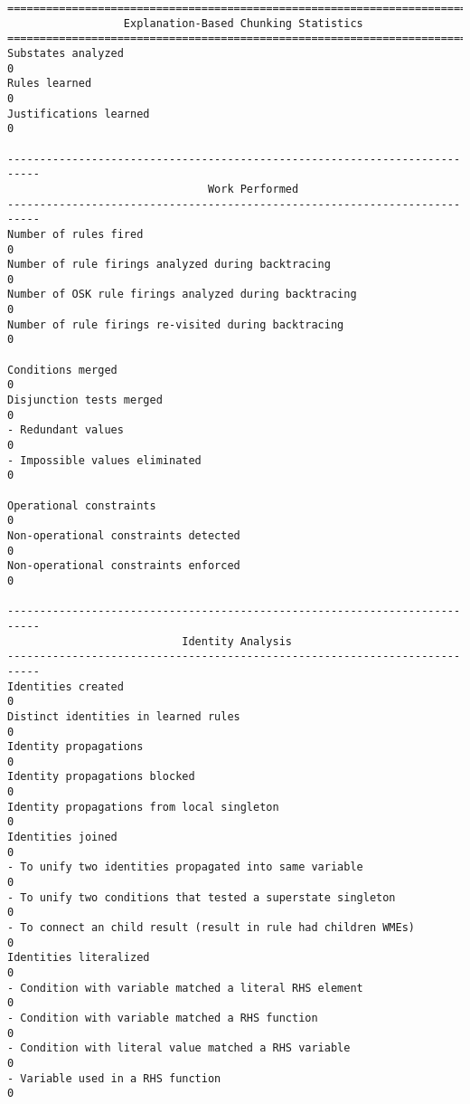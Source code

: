 \begin{center}
{\small
\begin{verbatim}
===========================================================================
                  Explanation-Based Chunking Statistics
===========================================================================
Substates analyzed                                                     0
Rules learned                                                          0
Justifications learned                                                 0

---------------------------------------------------------------------------
                               Work Performed
---------------------------------------------------------------------------
Number of rules fired                                                  0
Number of rule firings analyzed during backtracing                     0
Number of OSK rule firings analyzed during backtracing                 0
Number of rule firings re-visited during backtracing                   0

Conditions merged                                                      0
Disjunction tests merged                                               0
- Redundant values                                                     0
- Impossible values eliminated                                         0

Operational constraints                                                0
Non-operational constraints detected                                   0
Non-operational constraints enforced                                   0

---------------------------------------------------------------------------
                           Identity Analysis
---------------------------------------------------------------------------
Identities created                                                     0
Distinct identities in learned rules                                   0
Identity propagations                                                  0
Identity propagations blocked                                          0
Identity propagations from local singleton                             0
Identities joined                                                      0
- To unify two identities propagated into same variable                0
- To unify two conditions that tested a superstate singleton           0
- To connect an child result (result in rule had children WMEs)        0
Identities literalized                                                 0
- Condition with variable matched a literal RHS element                0
- Condition with variable matched a RHS function                       0
- Condition with literal value matched a RHS variable                  0
- Variable used in a RHS function                                      0


\end{verbatim}}
\end{center}
